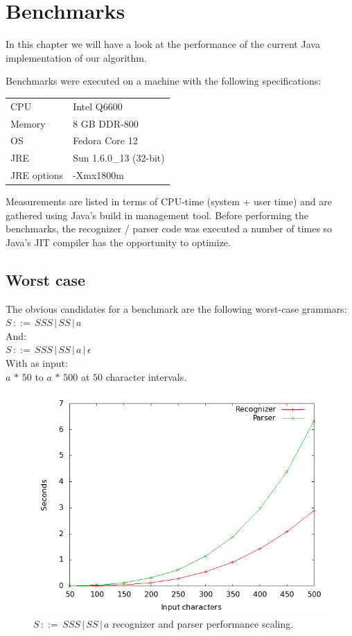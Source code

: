 \documentclass[a4paper,10pt]{article}
\begin{document}
\section{Benchmarks}

In this chapter we will have a look at the performance of the current Java implementation of our algorithm.

Benchmarks were executed on a machine with the following specifications:
\begin{table}[H]
\centering
\begin{tabular}{ | p{6em} | p{9em} | }
 \hline
 CPU & Intel Q6600 \\
 Memory & 8 GB DDR-800 \\
 OS & Fedora Core 12 \\
 JRE & Sun 1.6.0\_13 (32-bit) \\
 JRE options & -Xmx1800m \\
 \hline
\end{tabular}
\end{table}

Measurements are listed in terms of CPU-time (system + user time) and are gathered using Java's build in management tool. Before performing the benchmarks, the recognizer / parser code was executed a number of times so Java's JIT compiler has the opportunity to optimize.

\pagebreak
\subsection{Worst case}
\label{sec:worstcaseBench}

The obvious candidates for a benchmark are the following worst-case grammars:
$S\,::=\,SSS\,|\,SS\,|\,a$\\
And:\\
$S\,::=\,SSS\,|\,SS\,|\,a\,|\,\epsilon$\\
With as input:\\
$a\,*\,50$ to $a\,*\,500$ at $50$ character intervals.

\begin{figure}[H]
\centering
\includegraphics[scale=0.4]{worst-case.png}
\caption{$S\,::=\,SSS\,|\,SS\,|\,a$ recognizer and parser performance scaling.}
\end{figure}
\end{document}
